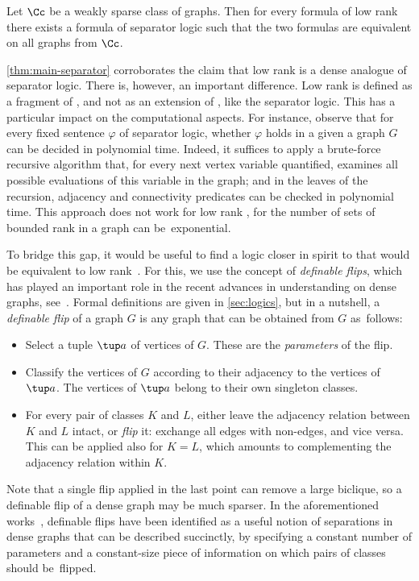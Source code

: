 \begin{theorem}
    \label{thm:main-separator}
    Let $\Cc$ be a weakly sparse class of graphs. Then for every formula of low rank \mso there exists a formula of separator logic such that the two formulas are equivalent on all graphs from $\Cc$.
\end{theorem}

\cref{thm:main-separator} corroborates the claim that low rank \mso is a dense analogue of separator logic. There is, however, an important difference. Low rank \mso is defined as a fragment of \mso, and not as an extension of \fo, like the separator logic. This has a particular impact on the computational aspects. For instance, observe that for every fixed sentence $\varphi$ of separator logic, whether $\varphi$ holds in a given a graph $G$ can be decided in polynomial time. Indeed, it suffices to apply a brute-force recursive algorithm that, for every next vertex variable quantified, examines all possible evaluations of this variable in the graph; and in the leaves of the recursion, adjacency and connectivity predicates can be checked in polynomial time. This approach does not work for low rank \mso, for the number of sets of bounded rank in a graph can be~exponential.

To bridge this gap, it would be useful to find a logic closer in spirit to \fo that would be equivalent to low rank~\mso. For this, we use the concept of {\em{definable flips}}, which has played an important role in the recent advances in understanding \fo on dense graphs, see~\cite{incremental-lemma,DreierMST23,DreierMT24,flippergame,Torunczyk23}. Formal definitions are given in \cref{sec:logics}, but in a nutshell, a {\em{definable flip}} of a graph $G$ is any graph that can be obtained from $G$ as~follows:
\begin{itemize}[nosep]
 \item Select a tuple $\tup a$ of vertices of $G$. These are the {\em{parameters}} of the flip.
 \item Classify the vertices of $G$ according to their adjacency to the vertices of $\tup a$. The vertices of $\tup a$ belong to their own singleton classes.
 \item For every pair of classes $K$ and $L$, either leave the adjacency relation between $K$ and $L$ intact, or {\em{flip}} it: exchange all edges with non-edges, and vice versa. This can be applied also for $K=L$, which amounts to complementing the adjacency relation within $K$.
\end{itemize}
Note that a single flip applied in the last point can remove a large biclique, so a definable flip of a dense graph may be much sparser. In the aforementioned works~\cite{incremental-lemma,DreierMST23,DreierMT24,flippergame,Torunczyk23}, definable flips have been identified as a useful notion of separations in dense graphs that can be described succinctly, by specifying a constant number of parameters and a constant-size piece of information on which pairs of classes should be~flipped.


